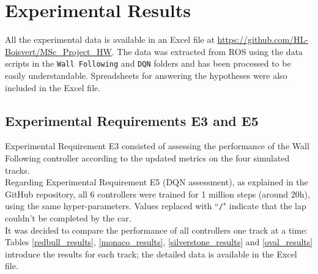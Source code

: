 
\chapter{Experimental Results} %

\label{Chapter7} %



All the experimental data is available in an Excel file at \url{https://github.com/HL-Boisvert/MSc_Project_HW}. The data was extracted from ROS using the data scripts in the \verb|Wall Following| and \verb|DQN| folders and has been processed to be easily understandable. Spreadsheets for answering the hypotheses were also included in the Excel file.

\section{Experimental Requirements E3 and E5}
\label{exp_assessment}
Experimental Requirement E3 consisted of assessing the performance of the Wall Following controller according to the updated metrics on the four simulated tracks. \\
Regarding Experimental Requirement E5 (DQN assessment), as explained in the GitHub repository, all 6 controllers were trained for 1 million steps (around 20h), using the same hyper-parameters. Values replaced with ``\verb|/|" indicate that the lap couldn't be completed by the car. \\
It was decided to compare the performance of all controllers one track at a time:
Tables \ref{redbull_results}, \ref{monaco_results}, \ref{silverstone_results} and \ref{oval_results} introduce the results for each track; the detailed data is available in the Excel file. \\

